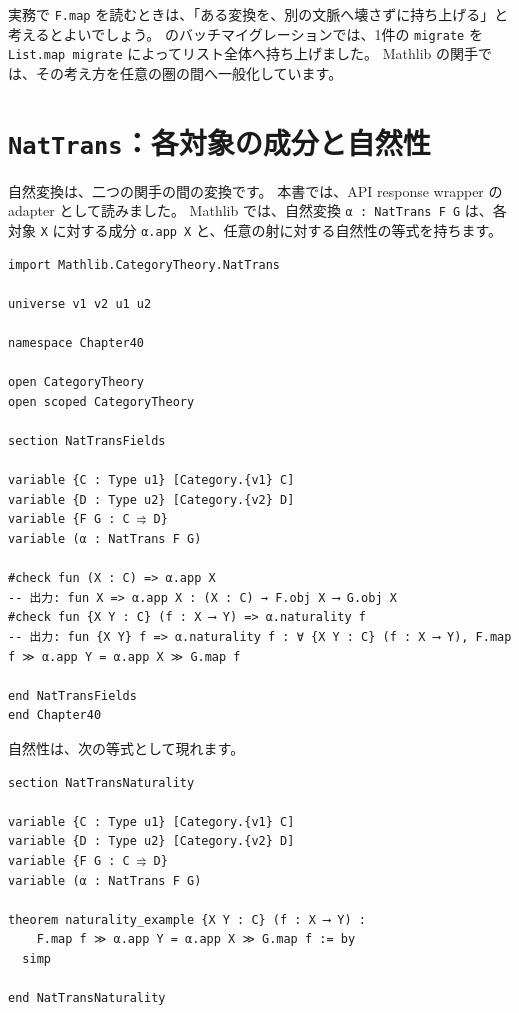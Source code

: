 実務で \texttt{F.map} を読むときは、「ある変換を、別の文脈へ壊さずに持ち上げる」と考えるとよいでしょう。
のバッチマイグレーションでは、1件の \texttt{migrate} を \texttt{List.map migrate} によってリスト全体へ持ち上げました。
Mathlib の関手では、その考え方を任意の圏の間へ一般化しています。

\section{\texttt{NatTrans}：各対象の成分と自然性}

自然変換は、二つの関手の間の変換です。
本書では、API response wrapper の adapter として読みました。
Mathlib では、自然変換 \texttt{α : NatTrans F G} は、各対象 \texttt{X} に対する成分 \texttt{α.app X} と、任意の射に対する自然性の等式を持ちます。

\begin{listing}[htbp]
\begin{verbatim}
import Mathlib.CategoryTheory.NatTrans

universe v1 v2 u1 u2

namespace Chapter40

open CategoryTheory
open scoped CategoryTheory

section NatTransFields

variable {C : Type u1} [Category.{v1} C]
variable {D : Type u2} [Category.{v2} D]
variable {F G : C ⥤ D}
variable (α : NatTrans F G)

#check fun (X : C) => α.app X
-- 出力: fun X => α.app X : (X : C) → F.obj X ⟶ G.obj X
#check fun {X Y : C} (f : X ⟶ Y) => α.naturality f
-- 出力: fun {X Y} f => α.naturality f : ∀ {X Y : C} (f : X ⟶ Y), F.map f ≫ α.app Y = α.app X ≫ G.map f

end NatTransFields
end Chapter40
\end{verbatim}
\caption{\texttt{NatTrans.app}・\texttt{NatTrans.naturality}}
\label{lst:ch40_nattrans_basic}
\end{listing}

自然性は、次の等式として現れます。

\begin{listing}[htbp]
\begin{verbatim}
section NatTransNaturality

variable {C : Type u1} [Category.{v1} C]
variable {D : Type u2} [Category.{v2} D]
variable {F G : C ⥤ D}
variable (α : NatTrans F G)

theorem naturality_example {X Y : C} (f : X ⟶ Y) :
    F.map f ≫ α.app Y = α.app X ≫ G.map f := by
  simp

end NatTransNaturality
\end{verbatim}
\caption{\texttt{naturality\_example}}
\label{lst:ch40_nattrans_naturality}
\end{listing}

